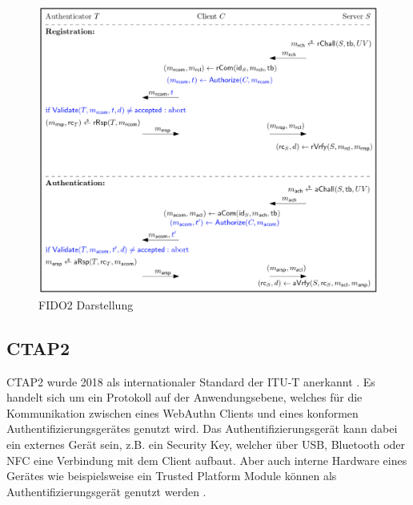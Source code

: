 \begin{figure}[H]
	\centering 
	\includegraphics[width=1\textwidth]{img/abbildungen/Fido2.png}
	\captionsetup{format=hang}
	\caption{FIDO2 Darstellung \cite{bindel2022fido2}} \label{fido2-process}
\end{figure}

\subsection{CTAP2}

\ac{CTAP2} wurde 2018 als internationaler Standard der \ac{ITU-T} anerkannt \cite{barbosa2021provable}. Es handelt sich um ein Protokoll auf der Anwendungsebene, welches für die Kommunikation zwischen eines WebAuthn Clients und eines konformen Authentifizierungsgerätes genutzt wird. Das Authentifizierungsgerät kann dabei ein externes Gerät sein, z.B. ein Security Key, welcher über USB, Bluetooth oder NFC eine Verbindung mit dem Client aufbaut. Aber auch interne Hardware eines Gerätes wie beispielsweise ein Trusted Platform Module können als Authentifizierungsgerät genutzt werden \cite{lyastani2020fido2}.


